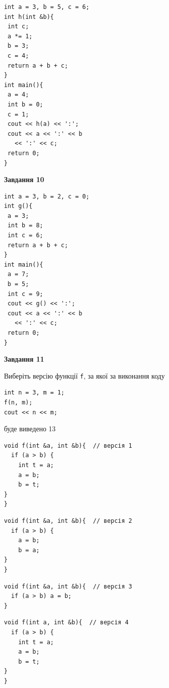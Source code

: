 \documentclass[12pt, ukrainian]{article}
\def\code#1{\Verb!#1!}
\begin{document}
{\begin {large}
\begin{minipage}[t]{7.0cm}
\begin{verbatim}
int a = 3, b = 5, c = 6;
int h(int &b){
 int c;
 a *= 1;
 b = 3;
 c = 4;
 return a + b + c;
}
int main(){
 a = 4;
 int b = 0;
 c = 1;
 cout << h(a) << ':';
 cout << a << ':' << b 
   << ':' << c;
 return 0;
}
\end{verbatim}



\begin{center}
\textbf{Завдання 10}
\end{center}
\vspace{-8mm}

\begin{verbatim}
int a = 3, b = 2, c = 0;
int g(){
 a = 3;
 int b = 8;
 int c = 6;
 return a + b + c;
}
int main(){
 a = 7;
 b = 5;
 int c = 9;
 cout << g() << ':';
 cout << a << ':' << b 
   << ':' << c;
 return 0;
}
\end{verbatim}

\end{minipage}
\vline \hspace{1mm}
\begin{minipage}[t]{11.0cm}

\begin{center}
\textbf{Завдання 11}
\end{center}
Виберіть версію функції \code{f}, за якої за виконання коду
\begin{verbatim}
int n = 3, m = 1;
f(n, m);
cout << n << m;
\end{verbatim}

буде виведено 13

\begin{verbatim}
void f(int &a, int &b){  // версія 1
  if (a > b) {
    int t = a;
    a = b;
    b = t;
}  
}
\end{verbatim}

\vspace{-8mm}\begin{verbatim}
void f(int &a, int &b){  // версія 2
  if (a > b) {
    a = b;
    b = a;
}  
}
\end{verbatim}

\vspace{-8mm}\begin{verbatim}
void f(int &a, int &b){  // версія 3
  if (a > b) a = b;
}
\end{verbatim}

\vspace{-8mm}\begin{verbatim}
void f(int a, int &b){  // версія 4
  if (a > b) {
    int t = a;
    a = b;
    b = t;
}  
}
\end{verbatim}




\end{minipage}
\end{large}}
\end{document}
